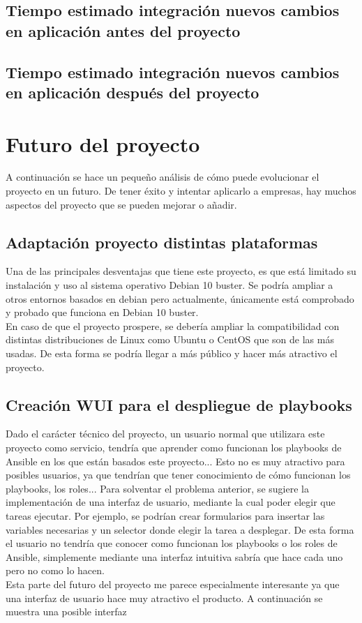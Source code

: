 \subsection{Tiempo estimado integración nuevos cambios en aplicación antes del proyecto}
\subsection{Tiempo estimado integración nuevos cambios en aplicación después del proyecto}


\section{Futuro del proyecto}
\begin{text}
	A continuación se hace un pequeño análisis de cómo puede evolucionar el proyecto en un futuro. De tener éxito y intentar aplicarlo a empresas, hay muchos aspectos del proyecto que se pueden mejorar o añadir. 
\end{text}
\subsection{Adaptación proyecto distintas plataformas}
\begin{text}
	Una de las principales desventajas que tiene este proyecto, es que está limitado su instalación y uso al sistema operativo Debian 10 buster. Se podría ampliar a otros entornos basados en debian pero actualmente, únicamente está comprobado y probado que funciona en Debian 10 buster. \\
	En caso de que el proyecto prospere, se debería ampliar la compatibilidad con distintas distribuciones de Linux como Ubuntu o CentOS que son de las más usadas. De esta forma se podría llegar a más público y hacer más atractivo el proyecto.
\end{text}
\subsection{Creación WUI para el despliegue de playbooks}
\begin{text}
	Dado el carácter técnico del proyecto, un usuario normal que utilizara este proyecto como servicio, tendría que aprender como funcionan los playbooks de Ansible en los que están basados este proyecto... Esto no es muy atractivo para posibles usuarios, ya que tendrían que tener conocimiento de cómo funcionan los playbooks, los roles... Para solventar el problema anterior, se sugiere la implementación de una interfaz de usuario, mediante la cual poder elegir que tareas ejecutar. Por ejemplo, se podrían crear formularios para insertar las variables necesarias y un selector donde elegir la tarea a desplegar. De esta forma el usuario no tendría que conocer como funcionan los playbooks o los roles de Ansible, simplemente mediante una interfaz intuitiva sabría que hace cada uno pero no como lo hacen. \\
	Esta parte del futuro del proyecto me parece especialmente interesante ya que una interfaz de usuario hace muy atractivo el producto. A continuación se muestra una posible interfaz
\end{text}
